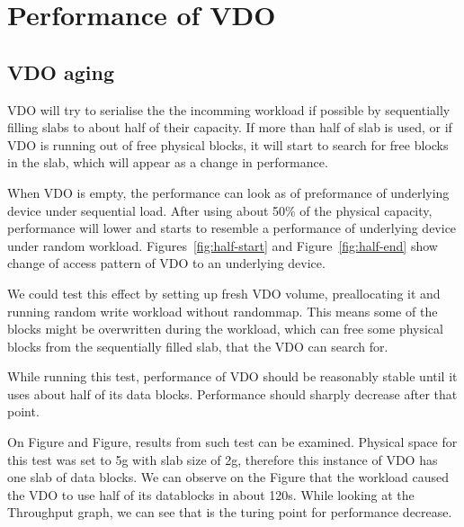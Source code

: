 \documentclass[
  color, %
  table, %
  lof,   %
  lot,   %
]{fithesis3}
\begin{document}
\chapter{Performance of VDO}
\label{testing}


\section{VDO aging}
\label{half}
VDO will try to serialise the the incomming workload if possible by sequentially filling slabs to about half of their capacity. If more than half of slab is used, or if VDO is running out of free physical blocks, it will start to search for free blocks in the slab, which will appear as a change in performance. 

When VDO is empty, the performance can look as of preformance of underlying device under sequential load. After using about 50\% of the physical capacity, performance will lower and starts to resemble a performance of underlying device under random workload. Figures~\ref{fig:half-start} and Figure~\ref{fig:half-end} show change of access pattern of VDO to an underlying device.

We could test this effect by setting up fresh VDO volume, preallocating it and running random write workload without randommap. This means some of the blocks might be overwritten during the workload, which can free some physical blocks from the sequentially filled slab, that the VDO can search for.

While running this test, performance of VDO should be reasonably stable until it uses about half of its data blocks. Performance should sharply decrease after that point.

On Figure and Figure, results from such test can be examined. Physical space for this test was set to 5g with slab size of 2g, therefore this instance of VDO has one slab of data blocks. We can observe on the Figure that the workload caused the VDO to use half of its datablocks in about 120s. While looking at the Throughput graph, we can see that is the turing point for performance decrease.
\end{document}

